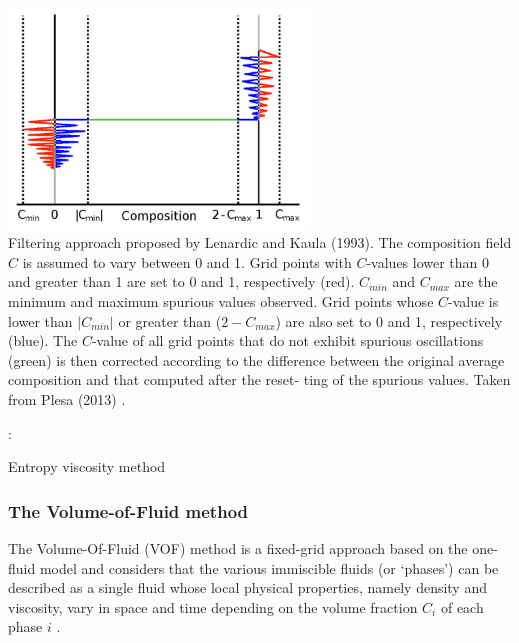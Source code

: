\begin{center}
\includegraphics[width=8cm]{images/compositions/plth13}\\
{\captionfont 
Filtering approach proposed by Lenardic and Kaula (1993). 
The composition field $C$ is assumed to vary between 0 and 1. Grid points with $C$-values 
lower than 0 and greater than 1 are set to 0 and 1, respectively (red). 
$C_{min}$ and $C_{max}$ are the minimum and maximum spurious values observed. 
Grid points whose $C$-value is lower than $|C_{min}|$ or greater than ($2-C_{max}$) 
are also set to 0 and 1, respectively (blue). 
The $C$-value of all grid points that do not exhibit spurious oscillations (green) is then corrected
according to the difference between the original average composition and that computed after the reset-
ting of the spurious values.
Taken from Plesa \etal (2013) \cite{plth13}.}
\end{center}











\Literature: \cite{vyrc13}

Entropy viscosity method \cite{gupa11}







\subsubsection{The Volume-of-Fluid method} 

The Volume-Of-Fluid (VOF) method is a fixed-grid approach based on the one-fluid model and considers that the various immiscible fluids (or `phases') can be described as a single fluid whose local physical properties, namely density and viscosity, vary in space and time depending on the volume fraction $C_i$ of each phase $i$ 
\cite{hini81,youn82}. 

